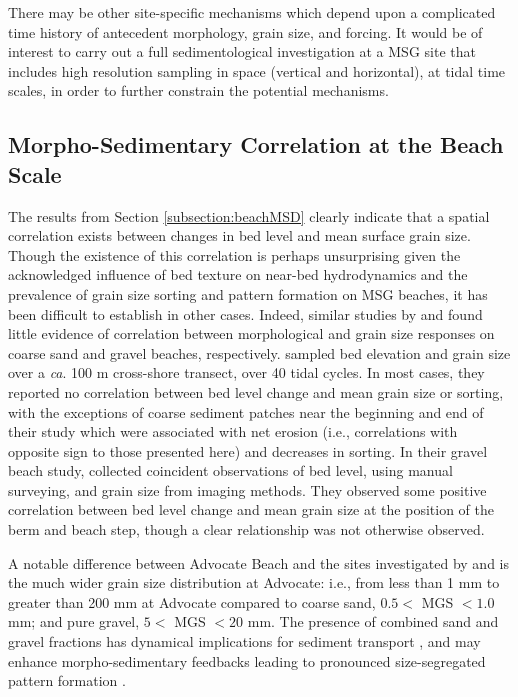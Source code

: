 There may be other site-specific mechanisms which depend upon a complicated time history of antecedent morphology, grain size, and forcing. It would be of interest to carry out a full sedimentological investigation at a MSG site that includes high resolution sampling in space (vertical and horizontal), at tidal time scales, in order to further constrain the potential mechanisms.


\subsection{Morpho-Sedimentary Correlation at the Beach Scale}\label{subsection:ChMSDBeach_corrDiscussion}

The results from Section \ref{subsection:beachMSD} clearly indicate that a spatial correlation exists between changes in bed level and mean surface grain size. Though the existence of this correlation is perhaps unsurprising given the acknowledged influence of bed texture on near-bed hydrodynamics and the prevalence of grain size sorting and pattern formation on MSG beaches, it has been difficult to establish in other cases. Indeed, similar studies by \citet{Masselink_etal2007} and \citet{Austin_Buscombe2008} found little evidence of correlation between morphological and grain size responses on coarse sand and gravel beaches, respectively. \citeauthor{Masselink_etal2007} sampled bed elevation and grain size over a \textit{ca}. 100 m cross-shore transect, over 40 tidal cycles. In most cases, they reported no correlation between bed level change and mean grain size or sorting, with the exceptions of coarse sediment patches near the beginning and end of their study which were associated with net erosion (i.e., correlations with opposite sign to those presented here) and decreases in sorting. In their gravel beach study, \citet{Austin_Buscombe2008} collected coincident observations of bed level, using manual surveying, and grain size from imaging methods. They observed some positive correlation between bed level change and mean grain size at the position of the berm and beach step, though a clear relationship was not otherwise observed. 

A notable difference between Advocate Beach and the sites investigated by \citet{Masselink_etal2007} and \citet{Austin_Buscombe2008} is the much wider grain size distribution at Advocate: i.e., from less than 1 mm to greater than 200 mm at Advocate compared to coarse sand, $0.5 <$ MGS $< 1.0$ mm; and pure gravel, $5 <$ MGS $< 20$ mm. The presence of combined sand and gravel fractions has dynamical implications for sediment transport \citep[e.g.,][]{Wilcock_McArdell1993, Wilcock_McArdell1997, Wilcock_Crowe2003}, and may enhance morpho-sedimentary feedbacks leading to pronounced size-segregated pattern formation \citep[e.g.,][]{LonguetHiggins_Parkin1962, Guest_Hay2019}. 

